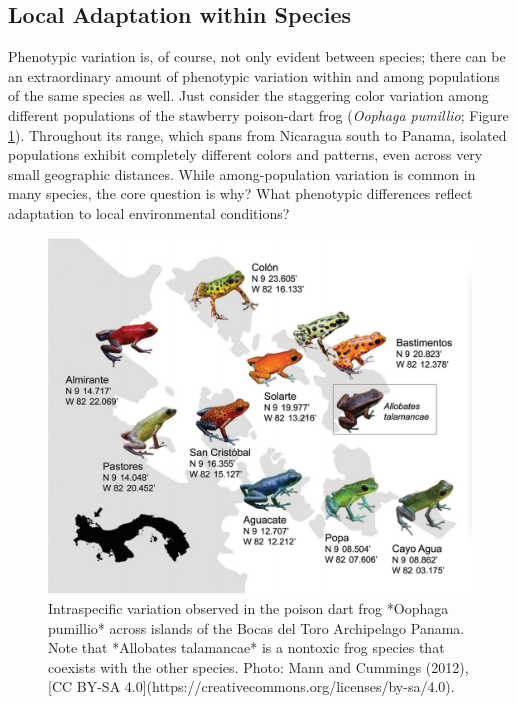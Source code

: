\documentclass[
]{book}
\begin{document}
\hypertarget{local-adaptation-within-species}{%
\subsection{Local Adaptation within Species}\label{local-adaptation-within-species}}

Phenotypic variation is, of course, not only evident between species; there can be an extraordinary amount of phenotypic variation within and among populations of the same species as well. Just consider the staggering color variation among different populations of the stawberry poison-dart frog (\emph{Oophaga pumillio}; Figure \ref{fig:intraspecvar}). Throughout its range, which spans from Nicaragua south to Panama, isolated populations exhibit completely different colors and patterns, even across very small geographic distances. While among-population variation is common in many species, the core question is why? What phenotypic differences reflect adaptation to local environmental conditions?

\begin{figure}
\includegraphics[width=1\linewidth]{images/dartfrog} \caption{Intraspecific variation observed in the poison dart frog *Oophaga pumillio* across islands of the Bocas del Toro Archipelago Panama. Note that *Allobates talamancae* is a nontoxic frog species that coexists with the other species. Photo: Mann and Cummings (2012), [CC BY-SA 4.0](https://creativecommons.org/licenses/by-sa/4.0).}\label{fig:intraspecvar}
\end{figure}
\end{document}
